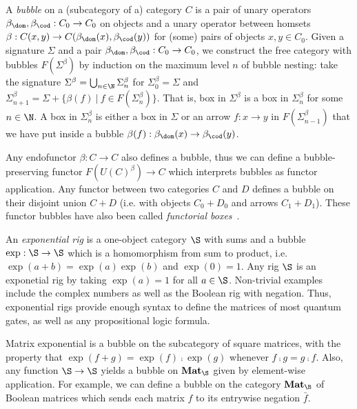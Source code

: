 A \emph{bubble} on a (subcategory of a) category $C$ is a pair of unary operators $\beta_\dom, \beta_\cod : C_0 \to C_0$ on objects and a unary operator between homsets $\beta : C(x, y) \to C(\beta_\dom(x), \beta_\cod(y))$ for (some) pairs of objects $x, y \in C_0$.
Given a signature $\Sigma$ and a pair $\beta_\dom, \beta_\cod : C_0 \to C_0$, we construct the free category with bubbles $F(\Sigma^\beta)$ by induction on the maximum level $n$ of bubble nesting: take the signature $\Sigma^\beta = \bigcup_{n \in \N} \Sigma^\beta_n$
for $\Sigma^\beta_0 = \Sigma$ and $\Sigma^\beta_{n + 1} = \Sigma + \{ \beta(f) \ \vert \ f \in F(\Sigma^\beta_n) \}$.
That is, box in $\Sigma^\beta$ is a box in $\Sigma^\beta_{n}$ for some $n \in \N$.
A box in $\Sigma^\beta_{n}$ is either a box in $\Sigma$ or an arrow $f : x \to y$ in $F(\Sigma^\beta_{n - 1})$ that we have put inside a bubble $\beta(f) : \beta_\dom(x) \to \beta_\cod(y)$.

\begin{example}\label{example:endofunctor-bubbles}
Any endofunctor $\beta : C \to C$ also defines a bubble, thus we can define a bubble-preserving functor $F(U(C)^\beta) \to C$ which interprets bubbles as functor application.
Any functor between two categories $C$ and $D$ defines a bubble on their disjoint union $C + D$ (i.e. with objects $C_0 + D_0$ and arrows $C_1 + D_1$).
These functor bubbles have also been called \emph{functorial boxes}~\cite{Mellies06}.
\end{example}

\begin{example}
An \emph{exponential rig} is a one-object category $\S$ with sums and a bubble $\exp : \S \to \S$ which is a homomorphism from sum to product, i.e. $\exp(a + b) = \exp(a) \exp(b)$ and $\exp(0) = 1$.
Any rig $\S$ is an exponetial rig by taking $\exp(a) = 1$ for all $a \in \S$.
Non-trivial examples include the complex numbers as well as the Boolean rig with negation.
Thus, exponential rigs provide enough syntax to define the matrices of most quantum gates, as well as any propositional logic formula.
\end{example}

\begin{example}
Matrix exponential is a bubble on the subcategory of square matrices, with the property that $\exp(f + g) = \exp(f) \fcmp \exp(g)$ whenever $f \fcmp g = g \fcmp f$.
Also, any function $\S \to \S$ yields a bubble on $\mathbf{Mat}_\S$ given by element-wise application.
For example, we can define a bubble on the category $\mathbf{Mat}_\B$ of Boolean matrices which sends each matrix $f$ to its entrywise negation $\bar{f}$.
\end{example}

